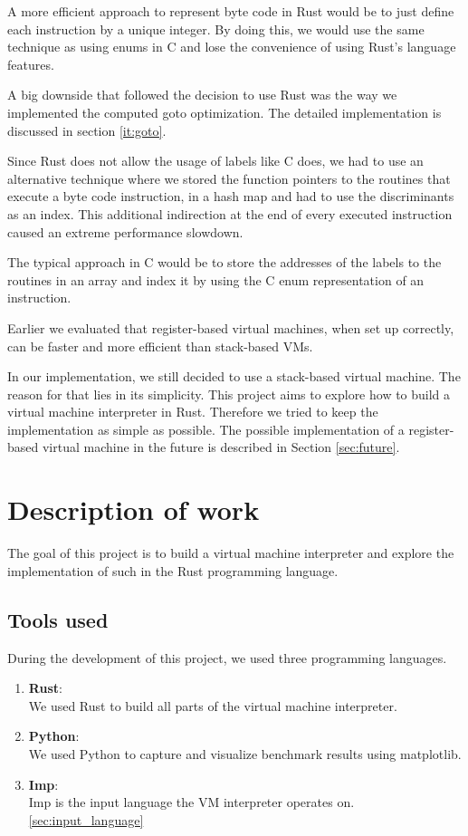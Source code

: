 \documentclass{article}
\begin{document}
A more efficient approach to represent byte code in Rust would be to just
define each instruction by a unique integer. By doing this, we would use the
same technique as using enums in C and lose the convenience of using Rust's
language features.
 
A big downside that followed the decision to use Rust was the way we 
implemented the computed goto optimization. The detailed implementation is
discussed in section \ref{it:goto}.

Since Rust does not allow the usage of labels like C does, we had to use an
alternative technique where we stored the function pointers to the routines
that execute a byte code instruction, in a hash map and had to use the
discriminants as an index. This additional indirection at the end of every 
executed instruction caused an extreme performance slowdown.

The typical approach in C would be to store the addresses of the labels to the
routines in an array and index it by using the C enum representation of an
instruction.

Earlier we evaluated that register-based virtual machines, when set up
correctly, can be faster and more efficient than stack-based VMs.

In our implementation, we still decided to use a stack-based virtual machine.
The reason for that lies in its simplicity. This project aims to explore
how to build a virtual machine interpreter in Rust. Therefore we tried to
keep the implementation as simple as possible. The possible implementation of
a register-based virtual machine in the future is described in Section
\ref{sec:future}.

\section{Description of work}
The goal of this project is to build a virtual machine interpreter and 
explore the implementation of such in the Rust programming language.

\subsection{Tools used}
During the development of this project, we used three programming languages. 

\begin{enumerate}
    \item \textbf{Rust}:\\
        We used Rust to build all parts of the virtual machine interpreter.
    \item \textbf{Python}:\\
        We used Python to capture and visualize benchmark results using matplotlib.
    \item \textbf{Imp}:\\
        Imp is the input language the VM interpreter operates on. \ref{sec:input_language}
\end{enumerate}
\end{document}
